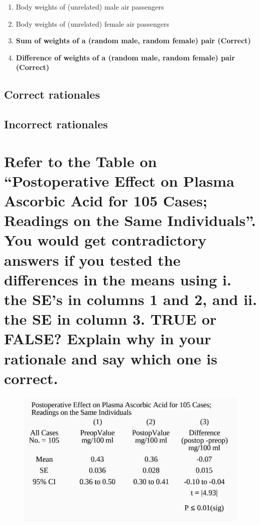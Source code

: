 \documentclass[letterpaper,9pt,twoside,printwatermark=false]{pinp}
\providecommand{\tightlist}{%
  \setlength{\itemsep}{0pt}\setlength{\parskip}{0pt}}
\begin{document}
\begin{enumerate}
\def\labelenumi{\alph{enumi}.}
\tightlist
\item
  Body weights of (unrelated) male air passengers
\item
  Body weights of (unrelated) female air passengers
\item
  \textbf{Sum of weights of a (random male, random female) pair
  (Correct)}
\item
  \textbf{Difference of weights of a (random male, random female) pair
  (Correct)}
\end{enumerate}

\subsection{Correct rationales}\label{correct-rationales-1}

\subsection{Incorrect rationales}\label{incorrect-rationales-1}

\section{\texorpdfstring{Refer to the Table on ``Postoperative Effect on
Plasma Ascorbic Acid for 105 Cases; Readings on the Same Individuals''.
You would get contradictory answers if you tested the differences in the
means using i. the SE's in columns 1 and 2, and ii. the SE in column 3.
TRUE or FALSE? Explain why in your rationale and say which one is
correct.}{Refer to the Table on Postoperative Effect on Plasma Ascorbic Acid for 105 Cases; Readings on the Same Individuals. You would get contradictory answers if you tested the differences in the means using i. the SE's in columns 1 and 2, and ii. the SE in column 3. TRUE or FALSE? Explain why in your rationale and say which one is correct.}}\label{refer-to-the-table-on-postoperative-effect-on-plasma-ascorbic-acid-for-105-cases-readings-on-the-same-individuals.-you-would-get-contradictory-answers-if-you-tested-the-differences-in-the-means-using-i.-the-ses-in-columns-1-and-2-and-ii.-the-se-in-column-3.-true-or-false-explain-why-in-your-rationale-and-say-which-one-is-correct.}

\begin{figure}
\centering
\includegraphics[scale=0.5]{tab3.jpg}
\end{figure}
\end{document}
